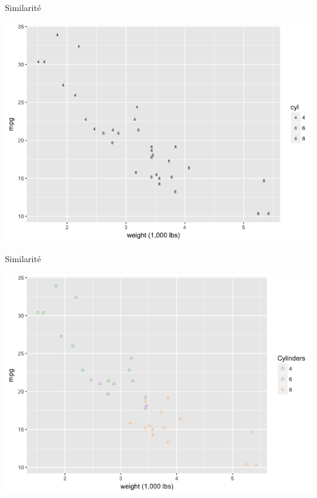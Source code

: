 \documentclass[french]{beamer}
\begin{document}
\begin{frame}{Similarité}
\begin{center}
	\includegraphics[height=0.8\textheight]{sim5}
\end{center}
\end{frame}

\begin{frame}{Similarité}
\begin{center}
	\includegraphics[height=0.8\textheight]{sim6}
\end{center}
\end{frame}
\end{document}
